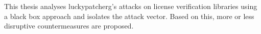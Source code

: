 This thesis analyses \gls{luckypatcherg}’s attacks on license verification libraries using a black box approach and isolates the attack vector.
Based on this, more or less disruptive countermeasures are proposed.
